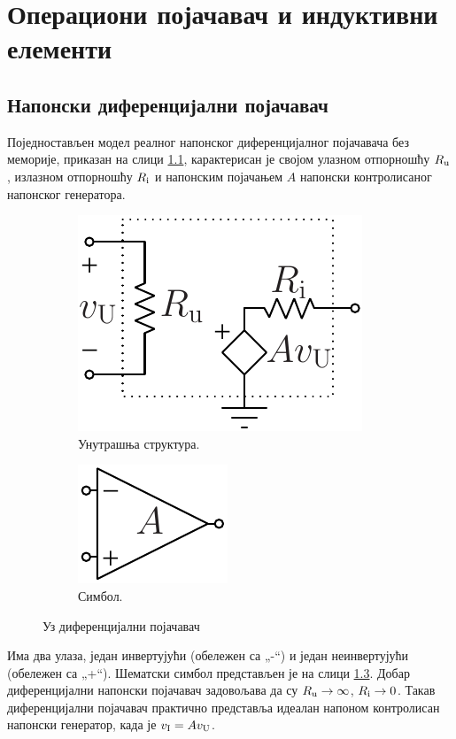 
\chapter{Операциони појачавач и индуктивни елементи}

\section{Напонски диференцијални појачавач}
Поједностављен модел реалног 
напонског 
диференцијалног појачавача без меморије, приказан на слици \ref{fig:da1}, карактерисан је својом улазном отпорношћу $R_{\rm u}$, 
излазном отпорношћу $R_{\rm i}$ и напонским појачањем $A$ напонски
контролисаног напонског генератора.  
%
\begin{figure}[ht!]
\centering
    \begin{subfigure}[c]{0.32\textwidth}
    \centering
        \includegraphics[scale=0.8]
        {fig/diff-amp.pdf}
        \caption{Унутрашња структура.}
        \label{fig:da1}
    \end{subfigure}
    \begin{subfigure}[c]{0.32\textwidth}
    \centering
        \includegraphics[scale=0.8]
        {fig/diff-amp-symb.pdf}
        \caption{Симбол.}
        \label{fig:da2}
    \end{subfigure}
\caption{Уз диференцијални појачавач}
\end{figure}
Има два улаза, један инвертујући 
(обележен са „-“) и један неинвертујући (обележен са „+“). Шематски симбол представљен је на 
слици \ref{fig:da2}.
Добар диференцијални напонски појачавач задовољава да су $R_{\rm u}\to\infty$, 
$R_{\rm i}\to0$. Такав диференцијални појачавач практично 
представља идеалан напоном контролисан напонски генератор, када је 
$v_{\rm I} = A v_{\rm U}$.

